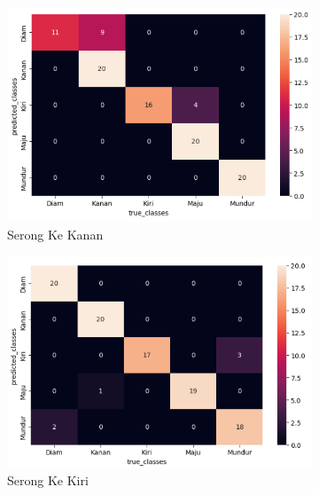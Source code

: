 \begin{enumerate}
  \begin{figure}[H]
    \centering
    \begin{subfigure}{0.4\textwidth}
      \centering
      \includegraphics[width=\linewidth]{../Gambar/cmtengahkanan.png}
      \caption{Serong Ke Kanan}
      \label{fig:cmtengahkanan}
    \end{subfigure}
    \begin{subfigure}{0.4\textwidth}
      \centering
      \includegraphics[width=\linewidth]{../Gambar/cmtengahkiri.png}
      \caption{Serong Ke Kiri}
      \label{fig:cmtengahkiri}
    \end{subfigure}
    \begin{subfigure}{0.4\textwidth}
      \centering

\end{subfigure}
\end{figure}
\end{enumerate}
